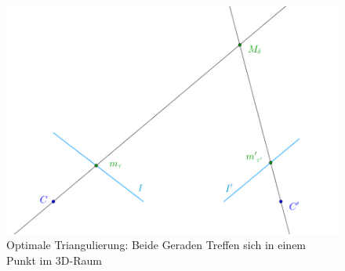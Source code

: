 
\begin{figure}[!htb]
	\centering
	\includegraphics[width=0.8\linewidth]{images/optimaleTriangulierung.png}
	\caption[Einfache Triangulation]{Optimale Triangulierung: Beide Geraden Treffen sich in einem Punkt im 3D-Raum} 
	\label{fig:TriangulationOptimal}
\end{figure}

